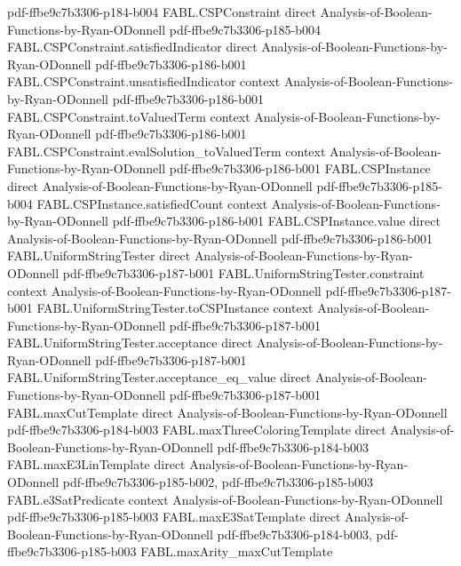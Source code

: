 \begin{theorem}
  {pdf-ffbe9c7b3306-p184-b004}
\proofstep
  {FABL.CSPConstraint}
  {direct}
  {Analysis-of-Boolean-Functions-by-Ryan-ODonnell}
  {pdf-ffbe9c7b3306-p185-b004}
\proofstep
  {FABL.CSPConstraint.satisfiedIndicator}
  {direct}
  {Analysis-of-Boolean-Functions-by-Ryan-ODonnell}
  {pdf-ffbe9c7b3306-p186-b001}
\proofstep
  {FABL.CSPConstraint.unsatisfiedIndicator}
  {context}
  {Analysis-of-Boolean-Functions-by-Ryan-ODonnell}
  {pdf-ffbe9c7b3306-p186-b001}
\proofstep
  {FABL.CSPConstraint.toValuedTerm}
  {context}
  {Analysis-of-Boolean-Functions-by-Ryan-ODonnell}
  {pdf-ffbe9c7b3306-p186-b001}
\proofstep
  {FABL.CSPConstraint.evalSolution_toValuedTerm}
  {context}
  {Analysis-of-Boolean-Functions-by-Ryan-ODonnell}
  {pdf-ffbe9c7b3306-p186-b001}
\proofstep
  {FABL.CSPInstance}
  {direct}
  {Analysis-of-Boolean-Functions-by-Ryan-ODonnell}
  {pdf-ffbe9c7b3306-p185-b004}
\proofstep
  {FABL.CSPInstance.satisfiedCount}
  {context}
  {Analysis-of-Boolean-Functions-by-Ryan-ODonnell}
  {pdf-ffbe9c7b3306-p186-b001}
\proofstep
  {FABL.CSPInstance.value}
  {direct}
  {Analysis-of-Boolean-Functions-by-Ryan-ODonnell}
  {pdf-ffbe9c7b3306-p186-b001}
\proofstep
  {FABL.UniformStringTester}
  {direct}
  {Analysis-of-Boolean-Functions-by-Ryan-ODonnell}
  {pdf-ffbe9c7b3306-p187-b001}
\proofstep
  {FABL.UniformStringTester.constraint}
  {context}
  {Analysis-of-Boolean-Functions-by-Ryan-ODonnell}
  {pdf-ffbe9c7b3306-p187-b001}
\proofstep
  {FABL.UniformStringTester.toCSPInstance}
  {context}
  {Analysis-of-Boolean-Functions-by-Ryan-ODonnell}
  {pdf-ffbe9c7b3306-p187-b001}
\proofstep
  {FABL.UniformStringTester.acceptance}
  {direct}
  {Analysis-of-Boolean-Functions-by-Ryan-ODonnell}
  {pdf-ffbe9c7b3306-p187-b001}
\proofstep
  {FABL.UniformStringTester.acceptance_eq_value}
  {direct}
  {Analysis-of-Boolean-Functions-by-Ryan-ODonnell}
  {pdf-ffbe9c7b3306-p187-b001}
\proofstep
  {FABL.maxCutTemplate}
  {direct}
  {Analysis-of-Boolean-Functions-by-Ryan-ODonnell}
  {pdf-ffbe9c7b3306-p184-b003}
\proofstep
  {FABL.maxThreeColoringTemplate}
  {direct}
  {Analysis-of-Boolean-Functions-by-Ryan-ODonnell}
  {pdf-ffbe9c7b3306-p184-b003}
\proofstep
  {FABL.maxE3LinTemplate}
  {direct}
  {Analysis-of-Boolean-Functions-by-Ryan-ODonnell}
  {pdf-ffbe9c7b3306-p185-b002,
    pdf-ffbe9c7b3306-p185-b003}
\proofstep
  {FABL.e3SatPredicate}
  {context}
  {Analysis-of-Boolean-Functions-by-Ryan-ODonnell}
  {pdf-ffbe9c7b3306-p185-b003}
\proofstep
  {FABL.maxE3SatTemplate}
  {direct}
  {Analysis-of-Boolean-Functions-by-Ryan-ODonnell}
  {pdf-ffbe9c7b3306-p184-b003,
    pdf-ffbe9c7b3306-p185-b003}
\proofstep
  {FABL.maxArity_maxCutTemplate}

\end{theorem}
